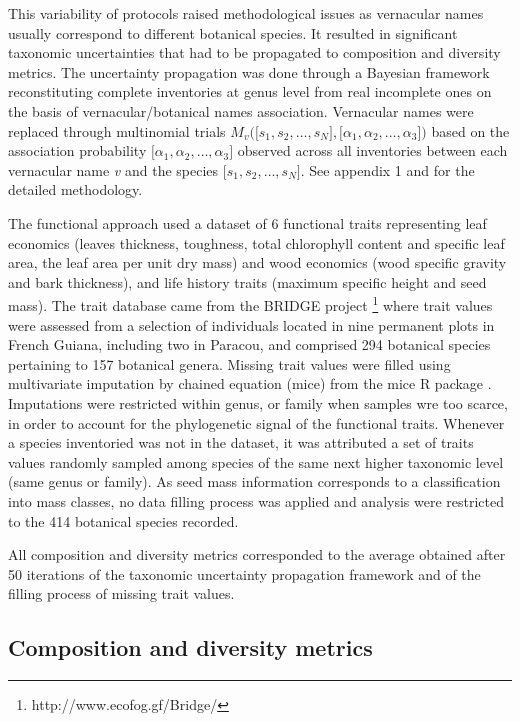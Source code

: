 \documentclass[fleqn,10pt]{ArtEcoFoG} %
\theoremstyle{definition}
\theoremstyle{definition}
\theoremstyle{definition}
\theoremstyle{remark}
\begin{document}
This variability of protocols raised methodological issues as vernacular
names usually correspond to different botanical species. It resulted in
significant taxonomic uncertainties that had to be propagated to
composition and diversity metrics. The uncertainty propagation was done
through a Bayesian framework reconstituting complete inventories at
genus level from real incomplete ones on the basis of
vernacular/botanical names association. Vernacular names were replaced
through multinomial trials
\(M_v\Big(\big[s_1, s_2, …, s_N\big],\big[\alpha_1, \alpha_2,…, \alpha_3\big]\Big)\)
based on the association probability
\(\big[\alpha_1, \alpha_2,…, \alpha_3\big]\) observed across all
inventories between each vernacular name \emph{v} and the species
\(\big[s_1, s_2, …, s_N\big]\). See appendix 1 and
\citet{Aubry-Kientz2013} for the detailed methodology.

The functional approach used a dataset of 6 functional traits
representing leaf economics (leaves thickness, toughness, total
chlorophyll content and specific leaf area, the leaf area per unit dry
mass) and wood economics (wood specific gravity and bark thickness), and
life history traits (maximum specific height and seed mass). The trait
database came from the BRIDGE project \footnote{http://www.ecofog.gf/Bridge/}
where trait values were assessed from a selection of individuals located
in nine permanent plots in French Guiana, including two in Paracou, and
comprised 294 botanical species pertaining to 157 botanical genera.
Missing trait values were filled using multivariate imputation by
chained equation (mice) from the mice R package \citep{Mice2011}.
Imputations were restricted within genus, or family when samples wre too
scarce, in order to account for the phylogenetic signal of the
functional traits. Whenever a species inventoried was not in the
dataset, it was attributed a set of traits values randomly sampled among
species of the same next higher taxonomic level (same genus or family).
As seed mass information corresponds to a classification into mass
classes, no data filling process was applied and analysis were
restricted to the 414 botanical species recorded.

All composition and diversity metrics corresponded to the average
obtained after 50 iterations of the taxonomic uncertainty propagation
framework and of the filling process of missing trait values.

\subsection{Composition and diversity
metrics}\label{composition-and-diversity-metrics}
\end{document}

